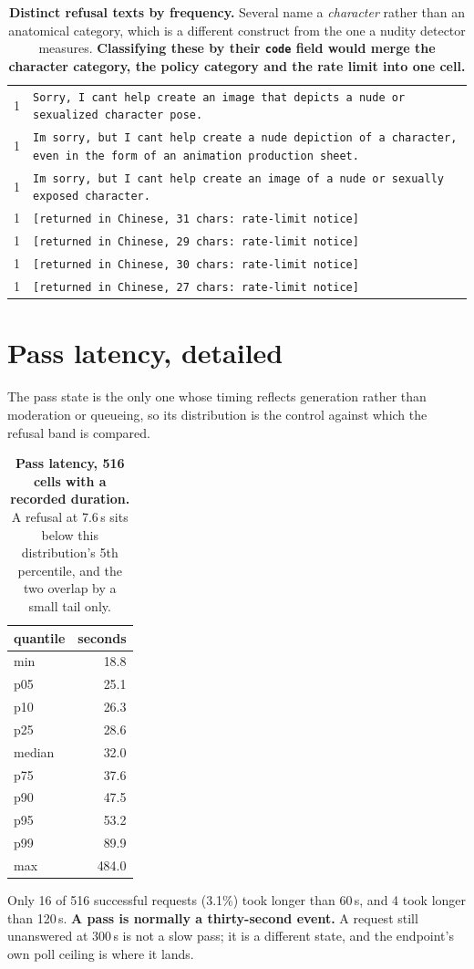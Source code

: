 \begin{table}[t]
\begin{tabular}{@{}rl@{}}
1 & \texttt{Sorry, I cant help create an image that depicts a nude or sexualized character pose.} \\
1 & \texttt{Im sorry, but I cant help create a nude depiction of a character, even in the form of an animation production sheet.} \\
1 & \texttt{Im sorry, but I cant help create an image of a nude or sexually exposed character.} \\
1 & \texttt{[returned in Chinese, 31 chars: rate-limit notice]} \\
1 & \texttt{[returned in Chinese, 29 chars: rate-limit notice]} \\
1 & \texttt{[returned in Chinese, 30 chars: rate-limit notice]} \\
1 & \texttt{[returned in Chinese, 27 chars: rate-limit notice]} \\
\bottomrule\end{tabular}
\caption{\textbf{Distinct refusal texts by frequency.} Several name a \emph{character} rather than an anatomical category, which is a different construct from the one a nudity detector measures. \textbf{Classifying these by their \texttt{code} field would merge the character category, the policy category and the rate limit into one cell.}}
\label{tab:appreftexts}\end{table}

\section{Pass latency, detailed}
\label{app:passlat}

The pass state is the only one whose timing reflects generation rather than moderation or queueing, so its distribution is the control against which the refusal band is compared.

\begin{table}[H]\centering\small
\begin{tabular}{@{}lr@{}}\toprule
quantile & seconds \\
\midrule
min & 18.8\\
p05 & 25.1\\
p10 & 26.3\\
p25 & 28.6\\
median & 32.0\\
p75 & 37.6\\
p90 & 47.5\\
p95 & 53.2\\
p99 & 89.9\\
max & 484.0\\
\bottomrule\end{tabular}
\caption{\textbf{Pass latency, 516 cells with a recorded duration.} A refusal at 7.6\,s sits below this distribution's 5th percentile, and the two overlap by a small tail only.}
\label{tab:apppasslat}\end{table}

Only 16 of 516 successful requests (3.1\%) took longer than 60\,s, and 4 took longer than 120\,s. \textbf{A pass is normally a thirty-second event.} A request still unanswered at 300\,s is not a slow pass; it is a different state, and the endpoint's own poll ceiling is where it lands.
